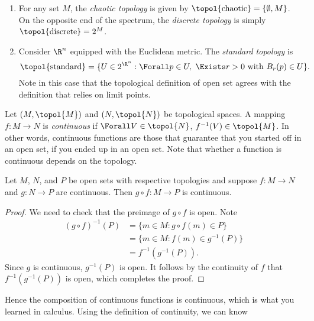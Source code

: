 \begin{example*}{}{}
  \leavevmode
  \begin{enumerate}
    \item For any set $M$, the {\it chaotic topology} 
          is given by $\topol{\text{chaotic}}=\{\emptyset,M\}$. On the 
          opposite end of the spectrum, the {\it discrete topology}
           is simply $\topol{\text{discrete}}=2^M$.
    \item Consider $\R^n$ equipped with the Euclidean metric. The
          {\it standard topology}  is 
          $$\topol{\text{standard}}=
          \{U\in2^{\R^n}:\Forall p\in U,\ \Exists r>0\ 
          \text{with}\ B_r(p)\in U\}.$$ Note in this case that the topological
          definition of open set agrees with the definition that relies
          on limit points.
  \end{enumerate}
\end{example*}
Let $(M,\topol{M})$ and $(N,\topol{N})$ be topological spaces. A mapping
$f:M\to N$ is {\it continuous}\index{map!continuous} if 
$\Forall V\in \topol{N}$, $f^{-1}(V)\in\topol{M}$.
In other words, continuous functions are those that guarantee that you started
off in an open set, if you ended up in an open set. Note that whether a
function is continuous depends on the topology.
\begin{theorem}{}{}
  Let $M$, $N$, and $P$ be open sets with respective topologies and suppose
  $f:M\to N$ and $g:N\to P$ are continuous. Then $g\circ f:M\to P$ is
  continuous.
  \begin{proof}
    We need to check that the preimage of $g\circ f$ is open. Note
    \begin{equation*}
    \begin{aligned}
      (g\circ f)^{-1}(P)&=\{m\in M:g\circ f(m)\in P\}\\
        &=\{m\in M:f(m)\in g^{-1}(P)\}\\
        &=f^{-1}(g^{-1}(P)).
    \end{aligned}
    \end{equation*}
    Since $g$ is continuous, $g^{-1}(P)$ is open. It follows by
    the continuity of $f$ that $f^{-1}(g^{-1}(P))$ is open,
    which completes the proof.
  \end{proof}
\end{theorem}
Hence the composition of continuous functions is continuous, which is what
you learned in calculus. Using the definition of continuity, we can know
